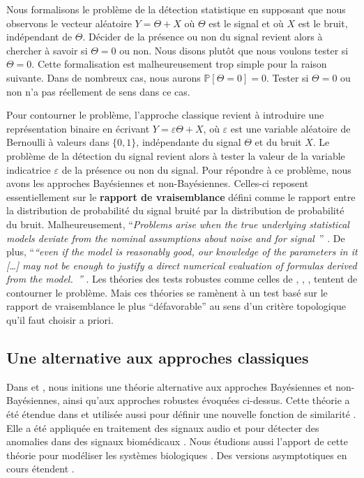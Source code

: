\documentclass[a4paper, 10pt]{article}
\begin{document}
Nous formalisons le problème de la détection statistique en supposant que nous observons le vecteur aléatoire $Y = \Theta + X$ où $\Theta$ est le signal et où $X$ est le bruit, indépendant de $\Theta$. Décider de la présence ou non du signal revient alors à chercher à savoir si $\Theta = 0$ ou non. Nous disons plutôt que nous voulons tester si $\Theta = 0$. Cette formalisation est malheureusement trop simple pour la raison suivante. Dans de nombreux cas, nous aurons ${\mathbb P} [ \Theta = 0] = 0$. Tester si $\Theta = 0$ ou non n'a pas réellement de sens dans ce cas.

Pour contourner le problème, l'approche classique revient à introduire une représentation binaire en écrivant $Y =\varepsilon \Theta + X$, où $\varepsilon$ est une variable aléatoire de Bernoulli à valeurs dans $\{0,1\}$, indépendante du signal $\Theta$ et du bruit $X$. Le problème de la détection du signal revient alors à tester la valeur de la variable indicatrice $\varepsilon$ de la présence ou non du signal. Pour répondre à ce problème, nous avons les approches Bayésiennes et non-Bayésiennes. Celles-ci reposent essentiellement sur le \textbf{rapport de vraisemblance} défini comme le rapport entre la distribution de probabilité du signal bruité par la distribution de probabilité du bruit. Malheureusement, ``{\em Problems arise when the true underlying statistical models deviate from the nominal assumptions about noise and for signal}~'' \cite{willet1997}. De plus, ``{\em “even if the model is reasonably good, our knowledge of the parameters in it [\ldots] may not be enough to justify a direct numerical evaluation of formulas derived from the model.~”} \cite{kailathDetectionStochasticProcesses1998}. Les théories des tests robustes comme celles de \cite{huberRobustStatistics2009}, \cite{kariya1989}, \cite{zoubir2021}, tentent de contourner le problème. Mais ces théories se ramènent à un test basé sur le rapport de vraisemblance le plus ``défavorable'' au sens d'un critère topologique qu'il faut choisir a priori.

\subsection{Une alternative aux approches classiques}
\label{sec: RDT}

Dans \cite{pastorRandomDistortionTesting2013} et \cite{pastorRandomDistortionTesting2018}, nous initions une théorie alternative aux approches Bayésiennes et non-Bayésiennes, ainsi qu'aux approches robustes évoquées ci-dessus. Cette théorie a été étendue dans \cite{pastorRobustStatisticalProcess2015, pastorRandomDistortionTesting2018, khanduriSequentialRandomDistortion2019, khanduriTruncatedSequentialNonParametric2019} et utilisée aussi pour définir une nouvelle fonction de similarité \cite{Bompais2018}. Elle a été appliquée en traitement des signaux audio \cite{Eurasip2012, Mai2018a} et pour détecter des anomalies dans des signaux biomédicaux \cite{BMC_BMEO_AutoPEEP_2012,Cherif2016}. Nous étudions aussi l'apport de cette théorie pour modéliser les systèmes biologiques \cite{EPJ2022}. Des versions asymptotiques en cours étendent \cite{ansel2021_ifsa, ansel2021_isvc}.
\end{document}

